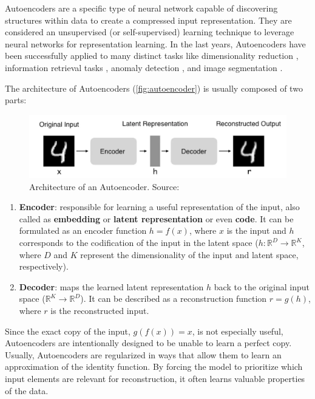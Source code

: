 Autoencoders are a specific type of neural network capable of discovering structures within data to create a compressed input representation. They are considered an unsupervised (or self-supervised) learning technique to leverage neural networks for representation learning. In the last years, Autoencoders have been successfully applied to many distinct tasks like dimensionality reduction \citep{petscharnig2017dimensionality, wang2015dimensionality}, information retrieval tasks \citep{pfeiffer2018neural}, anomaly detection \citep{sakurada2014anomaly}, and image segmentation \citep{baur2018deep, karimpouli2019segmentation}.

The architecture of Autoencoders (\autoref{fig:autoencoder}) is usually composed of two parts:

\begin{figure}[tb]
\centering
\includegraphics[width=\linewidth]{images/deep_learning/autoencoder.png}
\caption{Architecture of an Autoencoder. Source: \citep{autoencoder_architecture}}
\label{fig:autoencoder}
\end{figure}

\begin{enumerate}
\item \textbf{Encoder}: responsible for learning a useful representation of the input, also called as \textbf{embedding} or \textbf{latent representation} or even \textbf{code}. It can be formulated as an encoder function $h = f(x)$, where $x$ is the input and $h$ corresponds to the codification of the input in the latent space ($h: \mathbb{R}^D \rightarrow \mathbb{R}^K$, where $D$ and $K$ represent the dimensionality of the input and latent space, respectively).

\item \textbf{Decoder}: maps the learned latent representation $h$ back to the original input space ($\mathbb{R}^K \rightarrow \mathbb{R}^D$). It can be described as a reconstruction function $r = g(h)$, where $r$ is the reconstructed input.
\end{enumerate}

Since the exact copy of the input, $g(f(x)) = x$, is not especially useful, Autoencoders are intentionally designed to be unable to learn a perfect copy. Usually, Autoencoders are regularized in ways that allow them to learn an approximation of the identity function. By forcing the model to prioritize which input elements are relevant for reconstruction,  it often learns valuable properties of the data.

